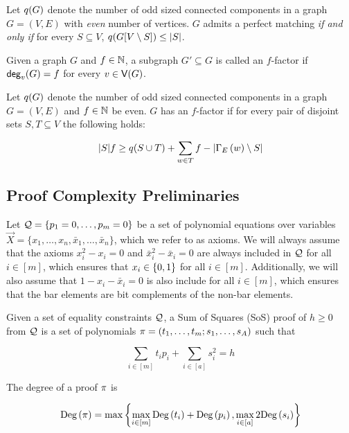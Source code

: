 \documentclass[11pt]{article}
\begin{document}
\begin{lemma}\label{lemma:tutte-criterion}
Let $q(G)$ denote the number of odd sized connected components in a graph $G=(V,E)$ with \emph{even} number of vertices.
$G$ admits a perfect matching \emph{if and only if} for every $S \subseteq V$, $q(G[V \setminus S]) \leq |S|$.
\end{lemma}

\begin{definition}[$f$-factor]\label{defn:f-factor}
  Given a graph $G$ and $f \in \mathbb{N}$, a subgraph $G' \subseteq G$ is called an $f$-factor if $\mathsf{deg}_{v}(G) = f$ for every $v \in \mathsf{V}(G)$.
\end{definition}


\begin{lemma}\label{lemma:tutte-criterion-factor}
  Let $q(G)$ denote the number of odd sized connected components in a graph $G=(V,E)$ and $f \in \mathbb{N}$ be even. $G$ has an $f$-factor if for every pair of disjoint sets $S, T \subseteq V$ the following holds:

  \[ |S|f \geq q(S \cup T) + \sum_{w \in T} f - |\Gamma_{E}\left(w\right) \setminus S| \]
\end{lemma}


\subsection{Proof Complexity Preliminaries}
\label{sec:proof-system-prelims}

Let $\mathcal{Q} = \{ p_1 = 0, \dots, p_m = 0\}$ be a set of polynomial equations over variables $\vec{X} = \{x_1, \dots, x_n, \bar{x}_1, \dots, \bar{x}_n\}$, which we refer to as axioms.
We will always assume that the axioms $x_i^2 - x_i = 0$ and $\bar{x}_i^2 - \bar{x}_i = 0$ are always included in $\mathcal{Q}$ for all $i \in [m]$, which ensures that $x_i \in \{0,1\}$ for all $i\in [m]$.
Additionally, we will also assume that $1 - x_i - \bar{x}_i=0$ is also include for all $i \in [m]$, which ensures that the bar elements are bit complements of the non-bar elements.

\begin{definition}\label{def:sum-of-squares} Given a set of equality constraints $\mathcal{Q}$, a Sum of Squares (SoS) proof of $h \geq 0$ from $\mathcal{Q}$ is a set of polynomials $\pi = (t_1, \dots, t_m; s_1, \dots, s_A)$ such that

\[ \sum_{i \in [m]} t_ip_i+ \sum_{i \in [a]} s_i^2 = h\]

The degree of a proof $\pi$ is

\[ \text{Deg}\left(\pi\right) = \max\left\{\max_{i \in [m]} \text{Deg}\left(t_i\right) + \text{Deg}\left(p_i\right), \max_{i \in [a]} 2\text{Deg}\left(s_i\right)\right\}\]


\end{definition}
\end{document}
